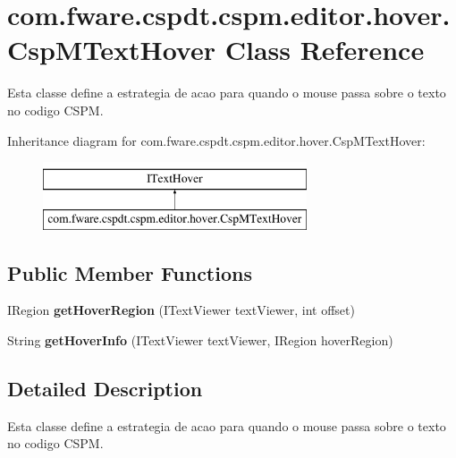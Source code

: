 \hypertarget{classcom_1_1fware_1_1cspdt_1_1cspm_1_1editor_1_1hover_1_1_csp_m_text_hover}{}\section{com.\+fware.\+cspdt.\+cspm.\+editor.\+hover.\+Csp\+M\+Text\+Hover Class Reference}
\label{classcom_1_1fware_1_1cspdt_1_1cspm_1_1editor_1_1hover_1_1_csp_m_text_hover}


Esta classe define a estrategia de acao para quando o mouse passa sobre o texto no codigo C\+S\+PM.  


Inheritance diagram for com.\+fware.\+cspdt.\+cspm.\+editor.\+hover.\+Csp\+M\+Text\+Hover\+:\begin{figure}[H]
\begin{center}
\leavevmode
\includegraphics[height=2.000000cm]{classcom_1_1fware_1_1cspdt_1_1cspm_1_1editor_1_1hover_1_1_csp_m_text_hover}
\end{center}
\end{figure}
\subsection*{Public Member Functions}
\begin{DoxyCompactItemize}
\item 
\mbox{\label{classcom_1_1fware_1_1cspdt_1_1cspm_1_1editor_1_1hover_1_1_csp_m_text_hover_aec291b826826f0cb61db572130f95cbd}} 
I\+Region {\bfseries get\+Hover\+Region} (I\+Text\+Viewer text\+Viewer, int offset)
\item 
\mbox{\label{classcom_1_1fware_1_1cspdt_1_1cspm_1_1editor_1_1hover_1_1_csp_m_text_hover_a23fed69af0b24aa640b81bc3b5edfe69}} 
String {\bfseries get\+Hover\+Info} (I\+Text\+Viewer text\+Viewer, I\+Region hover\+Region)
\end{DoxyCompactItemize}


\subsection{Detailed Description}
Esta classe define a estrategia de acao para quando o mouse passa sobre o texto no codigo C\+S\+PM. 

